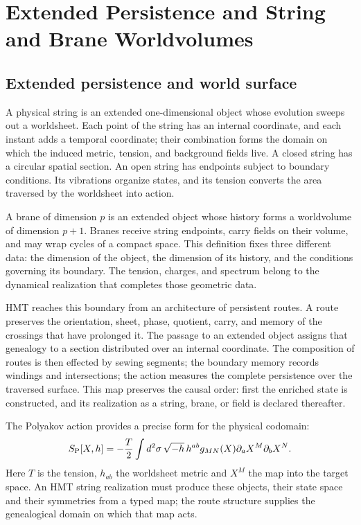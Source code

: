 \chapter{Extended Persistence and String and Brane Worldvolumes}
\label{mdp4:chap:teoria-m}

\section{Extended persistence and world surface}

A physical string is an extended one-dimensional object whose evolution sweeps out
a worldsheet. Each point of the string has an internal coordinate,
and each instant adds a temporal coordinate; their combination forms
the domain on which the induced metric, tension, and background fields
live. A closed string has a circular spatial section. An open string
has endpoints subject to boundary conditions. Its vibrations organize
states, and its tension converts the area traversed by the worldsheet into
action.

A brane of dimension \(p\) is an extended object whose history forms a
worldvolume of dimension \(p+1\). Branes receive string endpoints,
carry fields on their volume, and may wrap cycles of a compact
space. This definition fixes three different data: the dimension of the object,
the dimension of its history, and the conditions governing its boundary. The
tension, charges, and spectrum belong to the dynamical realization that
completes those geometric data.

HMT reaches this boundary from an architecture of persistent routes. A
route preserves the orientation, sheet, phase, quotient, carry, and memory of the
crossings that have prolonged it. The passage to an extended object assigns that
genealogy to a section distributed over an internal coordinate. The
composition of routes is then effected by sewing segments; the boundary
memory records windings and intersections; the action measures the
complete persistence over the traversed surface. This map preserves the
causal order: first the enriched state is constructed, and its realization
as a string, brane, or field is declared thereafter.

The Polyakov action provides a precise form for the physical codomain:
\[
 S_{\rm P}[X,h]
 =-\frac{T}{2}\int d^2\sigma\,
 \sqrt{-h}\,h^{ab}g_{MN}(X)
 \partial_aX^M\partial_bX^N.
\]
Here \(T\) is the tension, \(h_{ab}\) the worldsheet metric and
\(X^M\) the map into the target space. An HMT string realization must
produce these objects, their state space and their symmetries from a typed
map; the route structure supplies the genealogical domain on which
that map acts.


